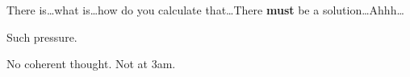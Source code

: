 \documentclass{article}
\title{\vspace{-2cm}\titlevar}
\author{\authorvar}
\date{\datevar}
\newcommand{\fade}{\dots}
\begin{document}
	\maketitle
	
	There is\fade what is\fade how do you calculate that\fade There \textbf{must} be a solution\fade Ahhh\fade
	\begin{center}
		Such pressure.
	\end{center}
	No coherent thought. Not at 3am.
\end{document}
